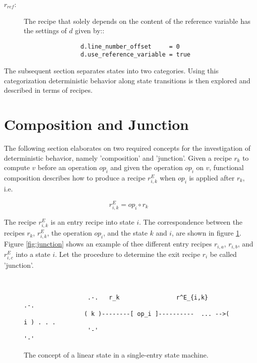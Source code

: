 \documentclass[12pt,a4paper]{scrartcl}
\begin{document}
\begin{description}
   \item[$r_{ref}$:] The recipe that solely depends on the content of the
       reference variable has the settings of $d$ given by::

        \begin{verbatim}
                d.line_number_offset     = 0
                d.use_reference_variable = true
        \end{verbatim}

\end{description}

The subsequent section separates states into two categories.  Using this
categorization deterministic behavior along state transitions is then explored
and described in terms of recipes.

%
\section{Composition and Junction}

The following section elaborates on two required concepts for the investigation
of deterministic behavior, namely 'composition' and 'junction'.  Given a recipe
$r_k$ to compute $v$ before an operation $op_i$ and given the operation $op_i$
on $v$, functional composition describes how to produce a recipe $r^E_{i,k}$
when $op_i$ is applied after $r_k$, i.e.

\begin{equation} \label{eq:composition}
    r^E_{i,k} = op_i \circ r_k
\end{equation}

The recipe $r^E_{i,k}$ is an entry recipe into state $i$. The correspondence
between the recipes $r_k$, $r^E_{i,k}$, the operation $op_i$, and the state $k$
and $i$, are shown in figure \ref{fig:composition}. Figure \ref{fig:junction}
shows an example of thee different entry recipes $r_{i,a}$, $r_{i,b}$, and
$r^E_{i,c}$ into a state $i$. Let the procedure to determine the exit
recipe $r_i$ be called 'junction'. 

\begin{figure}[htbp] \leavevmode \label{fig:composition}
\begin{verbatim}
                                                     
                                                    
                  .-.   r_k                r^E_{i,k}      .-.
                 ( k )--------[ op_i ]----------  ... -->( i ) . . .
                  '-'                                     '-'

\end{verbatim}
\caption{The concept of a linear state in a single-entry state machine.}
\end{figure}
\end{document}
